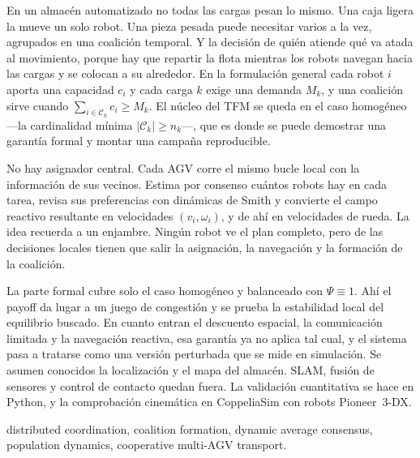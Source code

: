 \documentclass[12pt,a4paper]{article}
\begin{document}
\hypersetup{pageanchor=false}
\makeviucover
\hypersetup{pageanchor=true}


\thispagestyle{frontmatter}
\null
\clearpage

\begin{viuabstract}
En un almacén automatizado no todas las cargas pesan lo mismo. Una caja ligera la mueve
un solo robot. Una pieza pesada puede necesitar varios a la vez, agrupados en una
coalición temporal. Y la decisión de quién atiende qué va atada al movimiento, porque
hay que repartir la flota mientras los robots navegan hacia las cargas y se colocan a su
alrededor. En la formulación general cada robot $i$ aporta una capacidad $c_i$ y cada
carga $k$ exige una demanda $M_k$, y una coalición sirve cuando
$\sum_{i\in\mathcal{C}_k}c_i\geq M_k$. El núcleo del TFM se queda en el caso homogéneo
—la cardinalidad mínima $|\mathcal{C}_k|\geq n_k$—, que es donde se puede demostrar una
garantía formal y montar una campaña reproducible.

No hay asignador central. Cada AGV corre el mismo bucle local con la información de sus
vecinos. Estima por consenso cuántos robots hay en cada tarea, revisa sus preferencias
con dinámicas de Smith y convierte el campo reactivo resultante en velocidades
$(v_i,\omega_i)$, y de ahí en velocidades de rueda. La idea recuerda a un enjambre.
Ningún robot ve el plan completo, pero de las decisiones locales tienen que salir la
asignación, la navegación y la formación de la coalición.

La parte formal cubre solo el caso homogéneo y balanceado con $\Psi \equiv 1$. Ahí el
payoff da lugar a un juego de congestión y se prueba la estabilidad local del equilibrio
buscado. En cuanto entran el descuento espacial, la comunicación limitada y la navegación
reactiva, esa garantía ya no aplica tal cual, y el sistema pasa a tratarse como una
versión perturbada que se mide en simulación. Se asumen conocidos la localización y el
mapa del almacén. SLAM, fusión de sensores y control de contacto quedan fuera. La
validación cuantitativa se hace en Python, y la comprobación cinemática en CoppeliaSim
con robots Pioneer~3-DX.


\vspace{0.4em}
\enspace distributed coordination,
coalition formation, dynamic average consensus, population dynamics, cooperative
multi-AGV transport.\par
\end{viuabstract}
\end{document}
